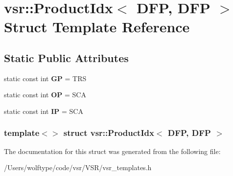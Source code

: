 \hypertarget{structvsr_1_1_product_idx_3_01_d_f_p_00_01_d_f_p_01_4}{\section{vsr\-:\-:Product\-Idx$<$ D\-F\-P, D\-F\-P $>$ Struct Template Reference}
\label{structvsr_1_1_product_idx_3_01_d_f_p_00_01_d_f_p_01_4}
}
\subsection*{Static Public Attributes}
\begin{DoxyCompactItemize}
\item 
\hypertarget{structvsr_1_1_product_idx_3_01_d_f_p_00_01_d_f_p_01_4_a7b3ae68d4bb37c135b4c3141d82cbafe}{static const int {\bfseries G\-P} = T\-R\-S}\label{structvsr_1_1_product_idx_3_01_d_f_p_00_01_d_f_p_01_4_a7b3ae68d4bb37c135b4c3141d82cbafe}

\item 
\hypertarget{structvsr_1_1_product_idx_3_01_d_f_p_00_01_d_f_p_01_4_a58b9bdcb4836b008037969dc4f7d0101}{static const int {\bfseries O\-P} = S\-C\-A}\label{structvsr_1_1_product_idx_3_01_d_f_p_00_01_d_f_p_01_4_a58b9bdcb4836b008037969dc4f7d0101}

\item 
\hypertarget{structvsr_1_1_product_idx_3_01_d_f_p_00_01_d_f_p_01_4_a8e69c03522086921574b7ac0f4dea107}{static const int {\bfseries I\-P} = S\-C\-A}\label{structvsr_1_1_product_idx_3_01_d_f_p_00_01_d_f_p_01_4_a8e69c03522086921574b7ac0f4dea107}

\end{DoxyCompactItemize}
\subsubsection*{template$<$$>$ struct vsr\-::\-Product\-Idx$<$ D\-F\-P, D\-F\-P $>$}



The documentation for this struct was generated from the following file\-:\begin{DoxyCompactItemize}
\item 
/\-Users/wolftype/code/vsr/\-V\-S\-R/vsr\-\_\-templates.\-h\end{DoxyCompactItemize}
